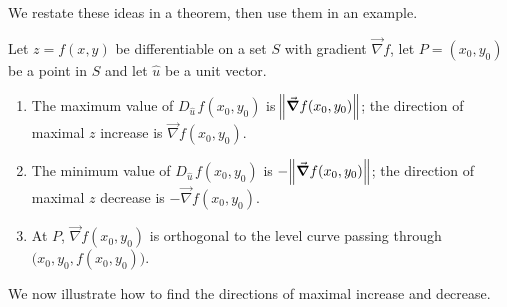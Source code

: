 We restate these ideas in a theorem, then use them in an example.



\begin{theorem}\label{thm:gradient}
Let $z=f(x,y)$ be differentiable on a set $S$ with gradient $\vec{\nabla} f$, let $P=(x_0,y_0)$ be a point in $S$ and let $\hat u$ be a unit vector.
\begin{enumerate}
	\item The maximum value of $D_{\hat u\,}f(x_0,y_0)$ is $\norm{\vec{\nabla} f(x_0,y_0)}$; the direction of maximal $z$ increase is $\vec{\nabla} f(x_0,y_0)$.
	\item   The minimum value of $D_{\hat u\,}f(x_0,y_0)$ is $-\norm{\vec{\nabla} f(x_0,y_0)}$; the direction of maximal $z$ decrease is $-\vec{\nabla} f(x_0,y_0)$.
	\item At $P$, $\vec{\nabla} f(x_0,y_0)$ is orthogonal to the level curve passing through $\big(x_0,y_0,f(x_0,y_0)\big)$.
\end{enumerate}
\end{theorem}

We now illustrate how to find the directions of  maximal increase and decrease. 

